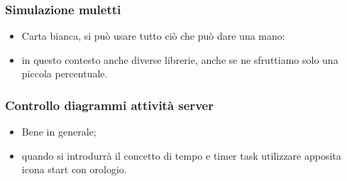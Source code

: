     \subsubsection{Simulazione muletti}
        \begin{itemize}
            \item Carta bianca, si può usare tutto ciò che può dare una mano:
            \item in questo contesto anche diverse librerie, anche se ne sfruttiamo solo  una piccola percentuale.
        \end{itemize}

    \subsubsection{Controllo diagrammi attività server}
        \begin{itemize}
            \item Bene in generale;
            \item quando si introdurrà il concetto di tempo e timer task utilizzare apposita icona start con orologio.
        \end{itemize}

